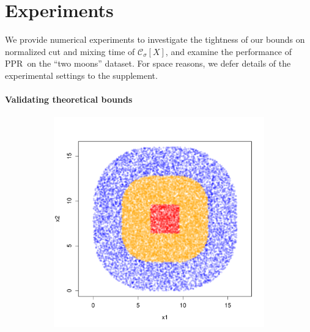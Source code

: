 \documentclass{article}
\newcommand{\1}{\mathbf{1}}
\newcommand{\Xbf}{X}             %
\newcommand{\Cset}{\mathcal{C}}
\newcommand{\Csig}{\Cset_{\sigma}}
\newcommand{\pprspace}{{\sc PPR~}}
\theoremstyle{aldenthm}
\theoremstyle{aldenrmrk}
\begin{document}
\section{Experiments}
\label{sec: experiments}

We provide numerical experiments to investigate the tightness of our bounds on normalized cut and mixing time of $\Csig[\Xbf]$, and examine the performance of \pprspace on the ``two moons'' dataset. For space reasons, we defer details of the experimental settings to the supplement.

\paragraph{Validating theoretical bounds}

\begin{figure}
	\centering
	\begin{adjustbox}{minipage=\linewidth}
		\begin{subfigure}{.33\linewidth}
			\includegraphics[width=\linewidth]{example1plots/sample2}
			\caption{}
		\end{subfigure}
		\begin{subfigure}{.33\linewidth}

\end{subfigure}
\end{adjustbox}
\end{figure}
\end{document}
